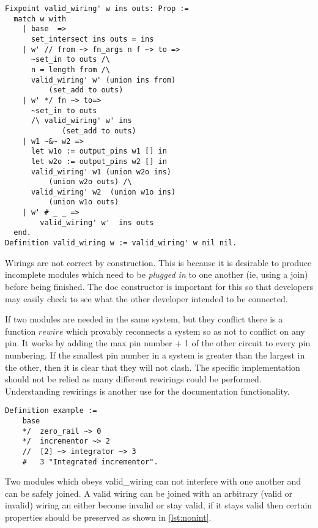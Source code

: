 \documentclass[preprint,12pt]{sigplanconf}
\begin{document}
\begin{lstlisting}[language=Coq, label={lst:validwire}, caption={Check that all pins that are
being read from are written to, that there is no contention for pins
(ie, two devices driving the same pin, and that all devices are fully
connected to the proper number of pins.)}]
Fixpoint valid_wiring' w ins outs: Prop :=
  match w with 
    | base  =>
      set_intersect ins outs = ins
    | w' // from ~> fn_args n f ~> to =>
      ~set_in to outs /\
      n = length from /\
      valid_wiring' w' (union ins from)
          (set_add to outs)
    | w' */ fn ~> to=>
      ~set_in to outs
      /\ valid_wiring' w' ins
             (set_add to outs)
    | w1 ~&~ w2 =>
      let w1o := output_pins w1 [] in
      let w2o := output_pins w2 [] in
      valid_wiring' w1 (union w2o ins)
          (union w2o outs) /\
      valid_wiring' w2  (union w1o ins)
          (union w1o outs)
    | w' # _ _ => 
        valid_wiring' w'  ins outs
  end.
Definition valid_wiring w := valid_wiring' w nil nil.
\end{lstlisting}

Wirings are not correct by construction. This is because it is
desirable to produce incomplete modules which need to be \emph{plugged in} to one
another (ie, using a join) before being finished. The doc constructor is 
important for this so that developers may easily check to see what the
other developer intended to be connected.

If two modules are needed in the same system, but they conflict there is a 
function $rewire$ which provably reconnects a system so as not to
conflict on any pin. It works by adding the max pin number + 1 of the
other circuit to every pin numbering. If the smallest pin number in a
system is greater than the largest in the other, then it is clear that
they will not clash. The specific implementation should not be relied
as many different rewirings could be performed. Understanding
rewirings is another use for the documentation functionality.


\begin{lstlisting}[language=Coq, caption={A simple wiring}, label={lst:simplewire}]
Definition example :=
    base 
    */  zero_rail ~> 0
    */  incrementor ~> 2
    //  [2] ~> integrator ~> 3
    #   3 "Integrated incrementor".
\end{lstlisting}

Two modules which obeys valid\_wiring can not interfere with one another and
can be safely joined. A valid wiring can be joined with an arbitrary
(valid or invalid)
wiring an either become invalid or stay valid, if it stays valid then
certain properties should be preserved as shown in \autoref{lst:nonint}.
\end{document}

